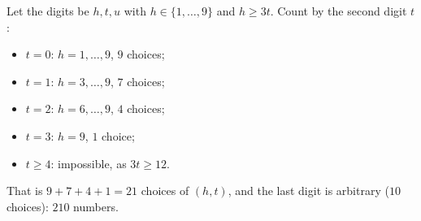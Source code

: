 Let the digits be $h,t,u$ with $h\in\{1,\dots,9\}$ and $h\ge3t$. Count by the second digit $t$:
\begin{itemize}
\item $t=0$: $h=1,\dots,9$, $9$ choices;
\item $t=1$: $h=3,\dots,9$, $7$ choices;
\item $t=2$: $h=6,\dots,9$, $4$ choices;
\item $t=3$: $h=9$, $1$ choice;
\item $t\ge4$: impossible, as $3t\ge12$.
\end{itemize}
That is $9+7+4+1=21$ choices of $(h,t)$, and the last digit is arbitrary ($10$ choices): $\boxed{210}$ numbers.
